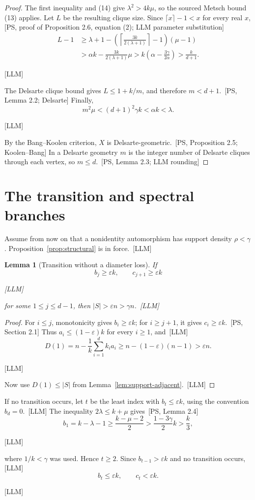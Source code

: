 \documentclass[10pt]{amsart}
\newtheorem{lemma}[theorem]{Lemma}
\theoremstyle{remark}
\newcommand{\eps}{\varepsilon}
\newcommand{\prov}[1]{\unskip\, {\normalfont\scriptsize\color{provgray}\textsf{[#1]}}}
\newcommand{\eqprov}[1]{%
  \par\nobreak\vspace{-0.68\baselineskip}%
  \noindent\hfill{\normalfont\scriptsize\color{provgray}\textsf{[#1]}}%
  \par\vspace{0.20\baselineskip}%
}
\begin{document}
\begin{proof}
The first inequality and (14) give $\lambda^2>4k\mu$, so the sourced Metsch bound (13) applies. Let $L$ be the resulting clique size. Since $\lceil x\rceil-1<x$ for every real $x$,\prov{PS, proof of Proposition 2.6, equation (2); LLM parameter substitution}
\[
\begin{aligned}
L-1
&\ge \lambda+1-\left(\left\lceil\frac{3k}{2(\lambda+1)}\right\rceil-1\right)(\mu-1)\\
&>\alpha k-\frac{3k}{2(\lambda+1)}\mu
>k\left(\alpha-\frac{3\gamma}{2\alpha}\right)
>\frac{k}{d+1}.
\end{aligned}
\]
\eqprov{LLM}
The Delsarte clique bound gives $L\le1+k/m$, and therefore $m<d+1$.\prov{PS, Lemma 2.2; Delsarte} Finally,
\[
m^2\mu<(d+1)^2\gamma k<\alpha k<\lambda.
\]
\eqprov{LLM}
By the Bang--Koolen criterion, $X$ is Delsarte-geometric.\prov{PS, Proposition 2.5; Koolen--Bang} In a Delsarte geometry $m$ is the integer number of Delsarte cliques through each vertex, so $m\le d$.\prov{PS, Lemma 2.3; LLM rounding}
\end{proof}

\section{The transition and spectral branches}
Assume from now on that a nonidentity automorphism has support density $\rho<\gamma$. Proposition~\ref{prop:structural} is in force.\prov{LLM}

\begin{lemma}[Transition without a diameter loss]\label{lem:transition}
If
\[
b_j\ge\eps k,\qquad c_{j+1}\ge\eps k
\]
\eqprov{LLM}
for some $1\le j\le d-1$, then $|S|>\eps n>\gamma n$.\prov{LLM}
\end{lemma}

\begin{proof}
For $i\le j$, monotonicity gives $b_i\ge\eps k$; for $i\ge j+1$, it gives $c_i\ge\eps k$.\prov{PS, Section 2.1} Thus $a_i\le(1-\eps)k$ for every $i\ge1$, and\prov{LLM}
\[
D(1)=n-\frac1k\sum_{i=1}^{d}k_i a_i
\ge n-(1-\eps)(n-1)>\eps n.
\]
\eqprov{LLM}
Now use $D(1)\le|S|$ from Lemma~\ref{lem:support-adjacent}.\prov{LLM}
\end{proof}

If no transition occurs, let $t$ be the least index with $b_t\le\eps k$, using the convention $b_d=0$.\prov{LLM} The inequality $2\lambda\le k+\mu$ gives\prov{PS, Lemma 2.4}
\[
b_1=k-\lambda-1\ge\frac{k-\mu-2}{2}>\frac{1-3\gamma}{2}k>\frac{k}{3},
\]
\eqprov{LLM}
where $1/k<\gamma$ was used. Hence $t\ge2$. Since $b_{t-1}>\eps k$ and no transition occurs,\prov{LLM}
\begin{equation}
b_t\le\eps k,\qquad c_t<\eps k.
\end{equation}
\eqprov{LLM}
\end{document}
